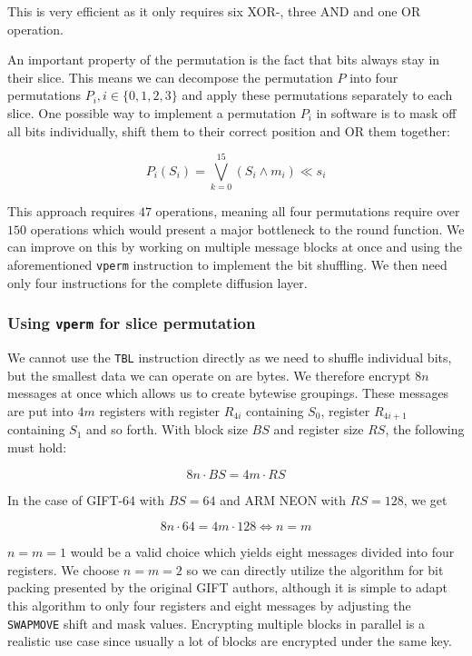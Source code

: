 This is very efficient as it only requires six XOR-, three AND and one OR
operation.

An important property of the permutation is the fact that bits always stay in
their slice. This means we can decompose the permutation $P$ into four
permutations $P_i,i\in\{0,1,2,3\}$ and apply these permutations
separately to each slice. One possible way to implement a permutation $P_i$ in
software is to mask off all bits individually, shift them to their correct
position and OR them together:

\[
    P_i(S_i)=\bigvee_{k=0}^{15}{(S_i\land m_i) \ll s_i}
\]

This approach requires $47$ operations, meaning all four permutations require
over $150$ operations which would present a major bottleneck to the round
function. We can improve on this by working on multiple message blocks at once
and using the aforementioned \texttt{vperm} instruction to implement the bit
shuffling. We then need only four instructions for the complete diffusion
layer.

\subsubsection{Using \texttt{vperm} for slice permutation}

We cannot use the \texttt{TBL} instruction directly as we need to shuffle
individual bits, but the smallest data we can operate on are bytes. We
therefore encrypt $8n$ messages at once which allows us to create bytewise
groupings. These messages are put into $4m$ registers with register $R_{4i}$
containing $S_0$, register $R_{4i+1}$ containing $S_1$ and so forth. With block
size $BS$ and register size $RS$, the following must hold:

\[
    8n\cdot BS=4m\cdot RS
\]

In the case of GIFT-64 with $BS=64$ and ARM NEON with $RS=128$, we get

\[
    8n\cdot 64=4m\cdot 128\Leftrightarrow n=m
\]

$n=m=1$ would be a valid choice which yields eight messages divided into four
registers. We choose $n=m=2$ so we can directly utilize the algorithm for bit
packing presented by the original GIFT authors, although it is simple to adapt
this algorithm to only four registers and eight messages by adjusting the
\texttt{SWAPMOVE} shift and mask values. Encrypting multiple blocks in parallel
is a realistic use case since usually a lot of blocks are encrypted under the
same key.

